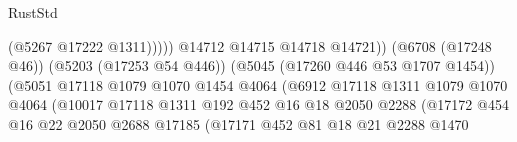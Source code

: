 \begin{lexlean}{RustStd}
\begin{coremodule}
                                                            (@5267 @17222 @1311)))))
                                                    @14712
                                                    @14715
                                                    @14718
                                                    @14721))
                                                (@6708 (@17248 @46))
                                                (@5203 (@17253 @54 @446))
                                                (@5045 (@17260 @446 @53 @1707 @1454))
                                                (@5051
                                                  @17118
                                                  @1079
                                                  @1070
                                                  @1454
                                                  @4064
                                                  (@6912
                                                    @17118
                                                    @1311
                                                    @1079
                                                    @1070
                                                    @4064
                                                    (@10017
                                                      @17118
                                                      @1311
                                                      @192
                                                      @452
                                                      @16
                                                      @18
                                                      @2050
                                                      @2288
                                                      (@17172
                                                        @454
                                                        @16
                                                        @22
                                                        @2050
                                                        @2688
                                                        @17185
                                                        (@17171
                                                          @452
                                                          @81
                                                          @18
                                                          @21
                                                          @2288
                                                          @1470

\end{coremodule}
\end{lexlean}
